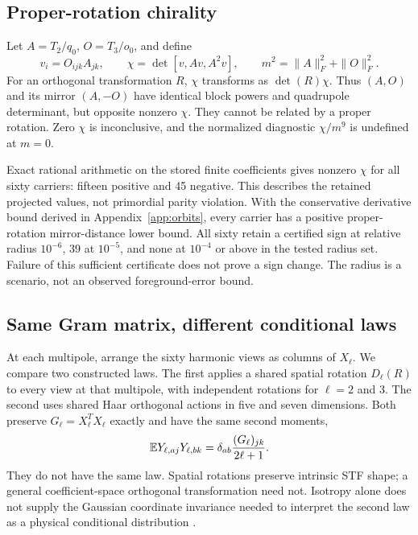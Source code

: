 \subsection{Proper-rotation chirality}

Let $A=T_2/q_0$, $O=T_3/o_0$, and define
\begin{equation}
 v_i=O_{ijk}A_{jk},\qquad
 \chi=\det[v,Av,A^2v],\qquad
 m^2=\|A\|_F^2+\|O\|_F^2.
 \label{eq:chirality}
\end{equation}
For an orthogonal transformation $R$, $\chi$ transforms as $\det(R)\chi$. Thus $(A,O)$ and its mirror $(A,-O)$ have identical block powers and quadrupole determinant, but opposite nonzero $\chi$. They cannot be related by a proper rotation. Zero $\chi$ is inconclusive, and the normalized diagnostic $\chi/m^9$ is undefined at $m=0$.

Exact rational arithmetic on the stored finite coefficients gives nonzero $\chi$ for all sixty carriers: fifteen positive and 45 negative. This describes the retained projected values, not primordial parity violation. With the conservative derivative bound derived in Appendix~\ref{app:orbits}, every carrier has a positive proper-rotation mirror-distance lower bound. All sixty retain a certified sign at relative radius $10^{-6}$, 39 at $10^{-5}$, and none at $10^{-4}$ or above in the tested radius set. Failure of this sufficient certificate does not prove a sign change. The radius is a scenario, not an observed foreground-error bound.

\subsection{Same Gram matrix, different conditional laws}

At each multipole, arrange the sixty harmonic views as columns of $X_\ell$. We compare two constructed laws. The first applies a shared spatial rotation $D_\ell(R)$ to every view at that multipole, with independent rotations for $\ell=2$ and 3. The second uses shared Haar orthogonal actions in five and seven dimensions. Both preserve $G_\ell=X_\ell^TX_\ell$ exactly and have the same second moments,
\begin{equation}
 \mathbb E Y_{\ell,aj}Y_{\ell,bk}
 =\delta_{ab}\frac{(G_\ell)_{jk}}{2\ell+1}.
 \label{eq:grammoment}
\end{equation}
They do not have the same law. Spatial rotations preserve intrinsic STF shape; a general coefficient-space orthogonal transformation need not. Isotropy alone does not supply the Gaussian coordinate invariance needed to interpret the second law as a physical conditional distribution \cite{BaldiMarinucci2007}.

